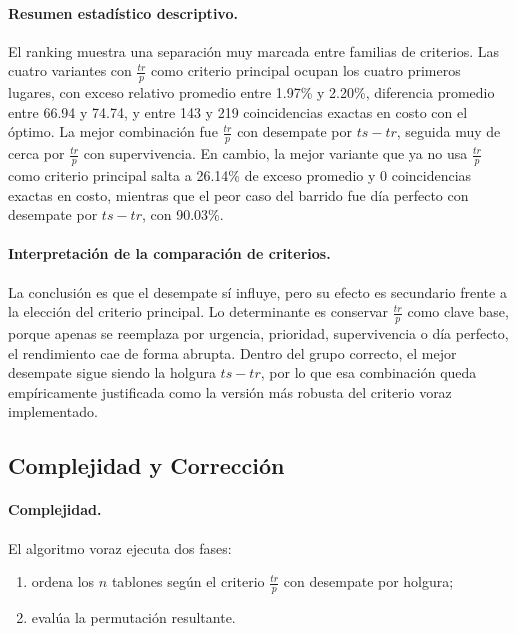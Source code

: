 \documentclass[12pt,a4paper]{article}
\begin{document}
\paragraph{Resumen estad\'istico descriptivo.}
El ranking muestra una separaci\'on muy marcada entre familias de criterios. Las cuatro variantes con \(\frac{tr}{p}\) como criterio principal ocupan los cuatro primeros lugares, con exceso relativo promedio entre 1.97\% y 2.20\%, diferencia promedio entre 66.94 y 74.74, y entre 143 y 219 coincidencias exactas en costo con el \'optimo. La mejor combinaci\'on fue \(\frac{tr}{p}\) con desempate por \(ts-tr\), seguida muy de cerca por \(\frac{tr}{p}\) con supervivencia. En cambio, la mejor variante que ya no usa \(\frac{tr}{p}\) como criterio principal salta a 26.14\% de exceso promedio y 0 coincidencias exactas en costo, mientras que el peor caso del barrido fue d\'ia perfecto con desempate por \(ts-tr\), con 90.03\%.

\paragraph{Interpretaci\'on de la comparaci\'on de criterios.}
La conclusi\'on es que el desempate s\'i influye, pero su efecto es secundario frente a la elecci\'on del criterio principal. Lo determinante es conservar \(\frac{tr}{p}\) como clave base, porque apenas se reemplaza por urgencia, prioridad, supervivencia o d\'ia perfecto, el rendimiento cae de forma abrupta. Dentro del grupo correcto, el mejor desempate sigue siendo la holgura \(ts-tr\), por lo que esa combinaci\'on queda emp\'iricamente justificada como la versi\'on m\'as robusta del criterio voraz implementado.

\subsection{Complejidad y Correcci\'on}

\paragraph{Complejidad.}
El algoritmo voraz ejecuta dos fases:
\begin{enumerate}
  \item ordena los \(n\) tablones seg\'un el criterio \(\frac{tr}{p}\) con desempate por holgura;
  \item eval\'ua la permutaci\'on resultante.
\end{enumerate}
\end{document}
